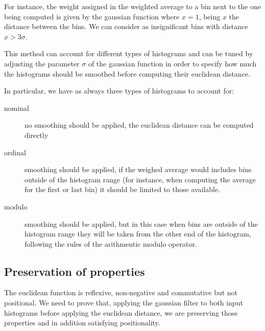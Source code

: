 For instance, the weight assigned in the weighted average to a bin next to the one being computed is given by the gaussian function where $x = 1$, being $x$ the distance between the bins. We can consider as insignificant bins with distance $x > 3\sigma$.

This method can account for different types of histograms and can be tuned by adjusting the parameter $\sigma$ of the gaussian function in order to specify how much the histograms should be smoothed before computing their euclidean distance.

In particular, we have as always three types of histograms to account for:

\begin{description}
  \item[nominal] no smoothing should be applied, the euclidean distance can be computed directly
  \item[ordinal] smoothing should be applied, if the weighed average would includes bins outside of the histogram range (for instance, when computing the average for the first or last bin) it should be limited to those available.
  \item[modulo] smoothing should be applied, but in this case when bins are outside of the histogram range they will be taken from the other end of the histogram, following the rules of the arithmentic modulo operator.
\end{description}

\subsection{Preservation of properties}

The euclidean function is reflexive, non-negative and commutative but not positional. We need to prove that, applying the gaussian filter to both input histograms before applying the euclidean distance, we are preserving those properties and in addition satisfying positionality.

